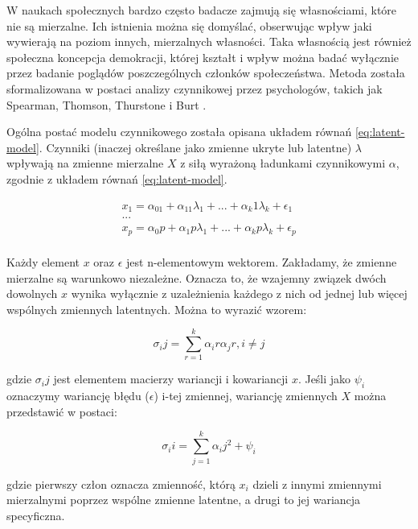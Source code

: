 \documentclass[12pt]{article}
\begin{document}
W naukach społecznych bardzo często badacze zajmują się własnościami, które nie są mierzalne. Ich istnienia można się domyślać, obserwując wpływ jaki wywierają na poziom innych, mierzalnych własności. Taka własnością jest również społeczna koncepcja demokracji, której kształt i wpływ można badać wyłącznie przez badanie poglądów poszczególnych członków społeczeństwa. Metoda została sformalizowana w postaci analizy czynnikowej przez psychologów, takich jak Spearman, Thomson, Thurstone i Burt \citep{Everitt}.

Ogólna postać modelu czynnikowego została opisana układem równań \ref{eq:latent-model}. Czynniki (inaczej określane jako zmienne ukryte lub latentne) \(\lambda\) wpływają na zmienne mierzalne \(X\) z siłą wyrażoną ładunkami czynnikowymi \(\alpha\), zgodnie z układem równań \ref{eq:latent-model}.

\begin{equation}
\label{eq:latent-model}
\begin{aligned} 
x_1 = \alpha_01 + \alpha_11 \lambda_1 + ... + \alpha_k1 \lambda_k + \epsilon_1\\
...\\
x_p = \alpha_0p + \alpha_1p \lambda_1 + ... + \alpha_kp \lambda_k + \epsilon_p\\
\end{aligned}
\end{equation}

Każdy element \(x\) oraz \(\epsilon\) jest n-elementowym wektorem. Zakładamy, że zmienne mierzalne są warunkowo niezależne. Oznacza to, że wzajemny związek dwóch dowolnych \(x\) wynika wyłącznie z uzależnienia każdego z nich od jednej lub więcej wspólnych zmiennych latentnych. Można to wyrazić wzorem:

\begin{equation}
\label{eq:shared-var}
\sigma_ij = \sum_{r=1}^k \alpha_ir \alpha_jr, i \neq j
\end{equation}

gdzie \(\sigma_ij\) jest elementem macierzy wariancji i kowariancji \(x\).
Jeśli jako \(\psi_i\) oznaczymy wariancję błędu (\(\epsilon\)) i-tej zmiennej, wariancję zmiennych \(X\) można przedstawić w postaci:

\begin{equation}
\label{eq:spec-var}
\sigma_ii = \sum_{j=1}^k \alpha_ij^2 + \psi_i
\end{equation}

gdzie pierwszy człon oznacza zmienność, którą \(x_i\) dzieli z innymi zmiennymi mierzalnymi poprzez wspólne zmienne latentne, a drugi to jej wariancja specyficzna.
\end{document}
